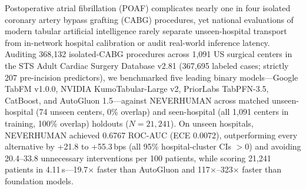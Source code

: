 \begin{natabstract}
Postoperative atrial fibrillation (POAF) complicates nearly one in four isolated coronary artery bypass grafting (CABG) procedures, yet national evaluations of modern tabular artificial intelligence rarely separate unseen-hospital transport from in-network hospital calibration or audit real-world inference latency. Auditing 368,132 isolated-CABG procedures across 1,091 US surgical centers in the STS Adult Cardiac Surgery Database v2.81 (367,695 labeled cases; strictly 207 pre-incision predictors), we benchmarked five leading binary models---Google TabFM v1.0.0, NVIDIA KumoTabular-Large v2, PriorLabs TabPFN-3.5, CatBoost, and AutoGluon 1.5---against NEVERHUMAN across matched unseen-hospital (74 unseen centers, 0\% overlap) and seen-hospital (all 1,091 centers in training, 100\% overlap) holdouts ($N{=}21{,}241$). On unseen hospitals, NEVERHUMAN achieved 0.6767 ROC-AUC (ECE 0.0072), outperforming every alternative by +21.8 to +55.3\,bps (all 95\% hospital-cluster CIs $>0$) and avoiding 20.4--33.8 unnecessary interventions per 100 patients, while scoring 21,241 patients in 4.11\,s---19.7$\times$ faster than AutoGluon and 117$\times$--323$\times$ faster than foundation models.
\end{natabstract}
